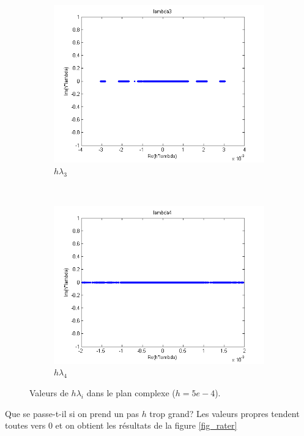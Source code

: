\begin{figure}
\begin{subfigure}[b]{0.5\textwidth}
    \includegraphics[width=\textwidth]{images/Q1_hlambda3.png}
    \caption{$h \lambda_3$}
  \end{subfigure}%
  ~
  \begin{subfigure}[b]{0.5\textwidth}
    \includegraphics[width=\textwidth]{images/Q1_hlambda4.png}
    \caption{$h \lambda_4$}
  \end{subfigure}
  \caption{Valeurs de $h \lambda_i$ dans le plan complexe ($h=5e-4$).}
  \label{fig:hlambda}
\end{figure}

Que se passe-t-il si on prend un pas $h$ trop grand? Les valeurs propres tendent toutes vers 0 et on obtient les résultats de la figure \ref{fig_rater}

